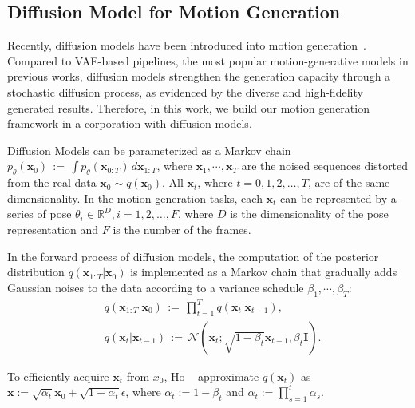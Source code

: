 \documentclass[10pt,twocolumn,letterpaper]{article}
\begin{document}
\subsection{Diffusion Model for Motion Generation}
\label{sec:mdm}




Recently, diffusion models have been introduced into motion generation~\cite{zhang2022motiondiffuse, tevet2022human}. Compared to VAE-based pipelines, the most popular motion-generative models in previous works, diffusion models strengthen the generation capacity through a stochastic diffusion process, as evidenced by the diverse and high-fidelity generated results. Therefore, in this work, we build our motion generation framework in a corporation with diffusion models.

Diffusion Models can be parameterized as a Markov chain $p_{\theta}(\mathbf{x}_0)\,:=\,\int{p_{\theta}(\mathbf{x}_{0:T})\,d{\mathbf{x}_{1:T}}}$, where $\mathbf{x}_{1},\cdots,\mathbf{x}_{T}$ are the noised sequences distorted from the real data $\mathbf{x}_0 \sim q(\mathbf{x}_0)$. All $\mathbf{x}_t$, where $t=0, 1, 2, \dots, T$, are of the same dimensionality. In the motion generation tasks, each $\mathbf{x}_t$ can be represented by a series of pose $\theta_i \in \mathbb{R}^D, i=1,2,\dots,F$, where $D$ is the dimensionality of the pose representation and $F$ is the number of the frames.

In the forward process of diffusion models, the computation of the posterior distribution $q(\mathbf{x}_{1:T} \vert \mathbf{x}_0)$ is implemented as a Markov chain that gradually adds Gaussian noises to the data according to a variance schedule $\beta_1, \cdots, \beta_T$:
\begin{equation}
    \begin{aligned}
        &q(\mathbf{x}_{1:T} \vert \mathbf{x}_0) \,:=\, \prod_{t=1}^{T} q(\mathbf{x}_t \vert \mathbf{x}_{t-1}), \\
        &q(\mathbf{x}_t \vert \mathbf{x}_{t-1}) \,:=\, \mathcal{N}(\mathbf{x}_t; \sqrt{1-\beta_t}\mathbf{x}_{t-1}, \beta_t\mathbf{I}).
    \end{aligned}
\end{equation}
\par

To efficiently acquire $\mathbf{x}_t$ from $x_0$, Ho \etal~\cite{ho2020denoising} approximate $q(\mathbf{x}_t)$ as $\mathbf{x}:=\sqrt{\bar{\alpha}_t} \mathbf{x}_0 + \sqrt{1 - \bar{\alpha}_t}\epsilon$, where $\alpha_t := 1 - \beta_t$ and $\bar{\alpha}_t:=\prod_{s=1}^t \alpha_s$.
\end{document}
